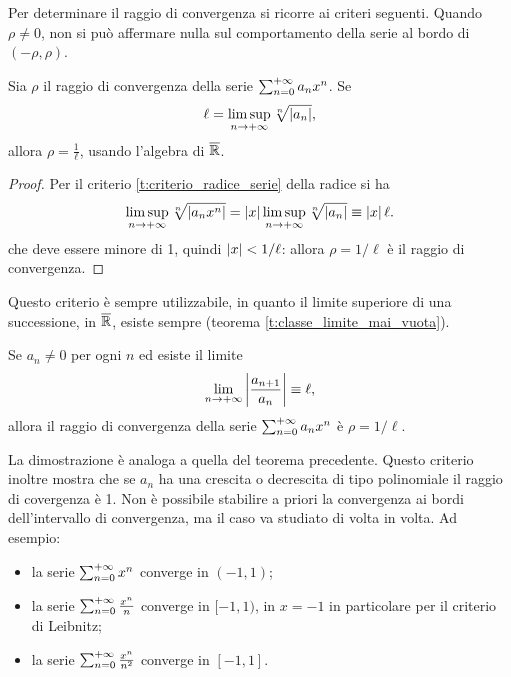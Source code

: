 Per determinare il raggio di convergenza si ricorre ai criteri seguenti.
Quando $\rho\neq 0$, non si può affermare nulla sul comportamento della serie al bordo di $(-\rho,\rho)$.
\begin{teorema}
Sia $\rho$ il raggio di convergenza della serie $\sum_{{n}=0}^{+\infty}a_nx^n$. Se
\[
\ell=\limsup_{n\to+\infty}\sqrt[n]{\left|{a_n}\right|},
\]
allora $\rho=\frac1{\ell}$, usando l'algebra di $\overline{\mathbb{R}}$.
\end{teorema}
\begin{proof}
Per il criterio \ref{t:criterio_radice_serie} della radice si ha
\[
\limsup_{n\to+\infty}\sqrt[n]{\left|{a_nx^n}\right|}=\left|{x}\right|\limsup_{n\to+\infty}\sqrt[n]{\left|{a_n}\right|}\equiv \left|{x}\right|\ell.
\]
che deve essere minore di 1, quindi $\left|{x}\right|<1/\ell$: allora $\rho=1/\ell$ è il raggio di convergenza.
\end{proof}
Questo criterio è sempre utilizzabile, in quanto il limite superiore di una successione, in $\overline{\mathbb{R}}$, esiste sempre (teorema \ref{t:classe_limite_mai_vuota}).
\begin{teorema}
Se $a_n\neq 0$ per ogni $n$ ed esiste il limite
\[
\lim_{n\to+\infty}\left|{\frac{a_{n+1}}{a_n}}\right|\equiv\ell,
\]
allora il raggio di convergenza della serie $\sum_{{n}=0}^{+\infty}a_nx^n$ è $\rho=1/\ell$.
\end{teorema}
La dimostrazione è analoga a quella del teorema precedente. Questo criterio inoltre mostra che se $a_n$ ha una crescita o decrescita di tipo polinomiale il raggio di covergenza è 1.
Non è possibile stabilire a priori la convergenza ai bordi dell'intervallo di convergenza, ma il caso va studiato di volta in volta. Ad esempio:
\begin{itemize}
\item la serie $\sum_{{n}=0}^{+\infty}x^n$ converge in $(-1,1)$;
\item la serie $\sum_{{n}=0}^{+\infty}\frac{x^n}{n}$ converge in $[-1,1)$, in $x=-1$ in particolare per il criterio di Leibnitz;
\item la serie $\sum_{{n}=0}^{+\infty}\frac{x^n}{n^2}$ converge in $[-1,1]$.
\end{itemize}

